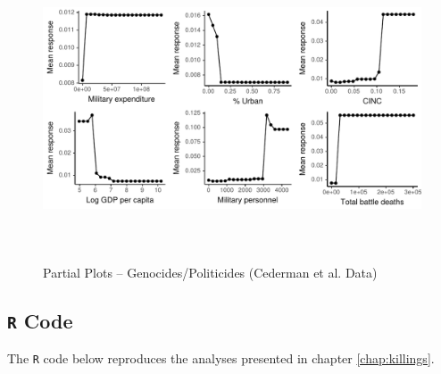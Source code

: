 \begin{figure}[H]
    \centering
    \includegraphics[width=\textwidth, height=9cm]{images/drfdpp7a.pdf}
    \caption{Partial Plots -- Genocides/Politicides (Cederman et al. Data)}
    \label{fig:my_label}
\end{figure}

\newpage

\subsection{\texttt{R} Code}
\label{sec:mk-code}

The \texttt{R} code below reproduces the analyses presented in chapter \ref{chap:killings}.

